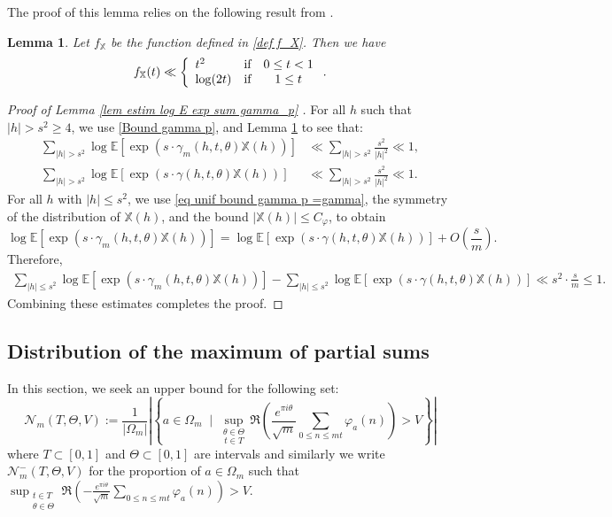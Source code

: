 \documentclass[12pt]{amsart}
\newtheorem{lem}[thm]{Lemma}
\theoremstyle{definition}
\numberwithin{equation}{section}
\numberwithin{equation}{section}
\def\E{\mathbb{E}}
\def\Ncal{\mathcal{N}}
\def\Mp{C_\varphi}
\def\X{\mathbb{X}}
\def\E{\mathbb{E}}
\begin{document}
The proof of this lemma relies on the following result from \cite{ABL21}.
\begin{lem}\cite[Lemma 5.3]{ABL21}\label{estim f} Let $f_\X$ be the function defined in \eqref{def f_X}. Then we have
\begin{equation}
  f_\X(t) \ll\left\{
   \begin{array}{l cc l}
         t^2 & \text{if}  & 0\leq t<1\\
     \log(2t) & \text{if}  & 1\leq t \\ 
   \end{array}  
   \right. .
\end{equation}
\end{lem}


\begin{proof}[Proof of Lemma \ref{lem estim log E exp sum gamma_p} ]
For all $h$ such that $|h| > s^2\geq 4$, we use \eqref{Bound gamma p}, and Lemma \ref{estim f} to see that:
\begin{align*}
    \sum_{|h|>s^2} \log \E \left[\exp \left(s \cdot  \gamma_m(h,t,\theta)\X(h)\right) \right] &\ll  \sum_{|h|>s^2} \frac{s^2}{|h|^2} \ll 1,\\
    \sum_{|h|>s^2} \log \E \left[\exp \left(s \cdot  \gamma(h,t,\theta)\X(h)\right) \right]  &\ll  \sum_{|h|>s^2} \frac{s^2}{|h|^2} \ll 1.
\end{align*}
For all \(h\) with \(|h| \leq s^2\), we use \eqref{eq unif bound gamma p =gamma}, the symmetry of the distribution of \(\X(h)\), and the bound \(|\X(h)| \leq \Mp\), to obtain
\[
\log \E \left[\exp \left(s \cdot  \gamma_m(h,t,\theta)\X(h)\right)\right] = 
\log \E \left[
\exp \left(s \cdot \gamma(h,t,\theta) \X(h) 
\right) \right] +O\left(\frac{s}{m}\right).
\]
Therefore,
\begin{align*}
    \sum_{|h|\leq s^2} \log \E \left[\exp \left(s \cdot  \gamma_m(h,t,\theta)\X(h)\right) \right]  -
    \sum_{|h|\leq s^2} \log \E \left[\exp \left(s \cdot  \gamma(h,t,\theta)\X(h)\right) \right] \ll s^2\cdot\frac{s}{m}\leq 1.
\end{align*}
Combining these estimates completes the proof.
\end{proof}


\subsection{Distribution of the maximum of partial sums}

In this section, we seek an upper bound for the following set:
\[
\Ncal_m(T,\Theta, V) := \frac{1}{|\Omega_m|}\left|\left\{
a\in \Omega_m\; \; \Big|\; \;
\underset{t\in T}{\sup_{\theta\in\Theta}}\,
\Re\left(
\frac{e^{\pi i \theta}}{\sqrt{m}}\sum_{0\leq n\leq m t} \varphi_a(n)
\right)> V
\right\}\right|
\]
where $T \subset [0,1]$ and $ \Theta \subset [0,1]$ are intervals and similarly we write $\Ncal_m^- (T,\Theta, V)$ for the proportion of $a \in \Omega_m$ such that $
\sup_{\substack{t\in T\\ \theta\in\Theta}}
\Re\left(-
\frac{e^{\pi i \theta}}{\sqrt{m}}\sum_{0\leq n\leq m t} \varphi_a(n)
\right)> V$.
\end{document}
